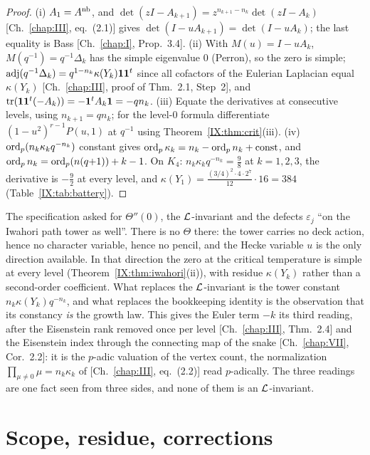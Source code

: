\begin{proof}
(i) $A_1=A^{\mathrm{nb}}$, and $\det(zI-A_{k+1})=z^{n_{k+1}-n_k}\det(zI-A_k)$ [Ch.~\ref{chap:III}, eq.~(2.1)] gives
$\det(I-uA_{k+1})=\det(I-uA_k)$; the last equality is Bass [Ch.~\ref{chap:I}, Prop.~3.4]. (ii) With
$M(u)=I-uA_k$, $M(q^{-1})=q^{-1}\Delta_k$ has the simple eigenvalue $0$ (Perron), so the
zero is simple; $\operatorname{adj}(q^{-1}\Delta_k)=q^{1-n_k}\kappa(Y_k)\mathbf1\mathbf1^{t}$ since all
cofactors of the Eulerian Laplacian equal $\kappa(Y_k)$ [Ch.~\ref{chap:III}, proof of Thm.~2.1, Step~2],
and $\operatorname{tr}(\mathbf1\mathbf1^{t}(-A_k))=-\mathbf1^{t}A_k\mathbf1=-qn_k$. (iii) Equate the
derivatives at consecutive levels, using $n_{k+1}=qn_k$; for the level-$0$ formula
differentiate $(1-u^{2})^{r-1}P(u,1)$ at $q^{-1}$ using Theorem~\ref{IX:thm:crit}(iii). (iv)
$\operatorname{ord}_p(n_k\kappa_kq^{-n_k})$ constant gives $\operatorname{ord}_p\kappa_k=n_k-\operatorname{ord}_pn_k+\mathrm{const}$,
and $\operatorname{ord}_pn_k=\operatorname{ord}_p(n(q{+}1))+k-1$. On $K_4$: $n_k\kappa_kq^{-n_k}=\frac98$ at
$k=1,2,3$, the derivative is $-\frac92$ at every level, and
$\kappa(Y_1)=\frac{(3/4)^{2}\cdot4\cdot2^{7}}{12}\cdot16=384$ (Table~\ref{IX:tab:battery}).
\end{proof}

\begin{remark}\label{IX:rem:noL}
The specification asked for $\Theta''(0)$, the $\mathcal{L}$-invariant and the defects
$\varepsilon_j$ ``on the Iwahori path tower as well''. There is no $\Theta$ there: the
tower carries no deck action, hence no character variable, hence no pencil, and the
Hecke variable $u$ is the only direction available. In that direction the zero at the
critical temperature is simple at every level (Theorem~\ref{IX:thm:iwahori}(ii)), with
residue $\kappa(Y_k)$ rather than a second-order coefficient. What replaces the
$\mathcal{L}$-invariant is the tower constant $n_k\kappa(Y_k)q^{-n_k}$, and what replaces the
bookkeeping identity is the observation that its constancy \emph{is} the growth law.
This gives the Euler term $-k$ its third reading, after the Eisenstein rank removed
once per level [Ch.~\ref{chap:III}, Thm.~2.4] and the Eisenstein index through the connecting map of
the snake [Ch.~\ref{chap:VII}, Cor.~2.2]: it is the $p$-adic valuation of the vertex count, the
normalization $\prod_{\mu\neq0}\mu=n_k\kappa_k$ of [Ch.~\ref{chap:III}, eq.~(2.2)] read $p$-adically.
The three readings are one fact seen from three sides, and none of them is an
$\mathcal{L}$-invariant.
\end{remark}

\section{Scope, residue, corrections}\label{IX:sec:scope}

